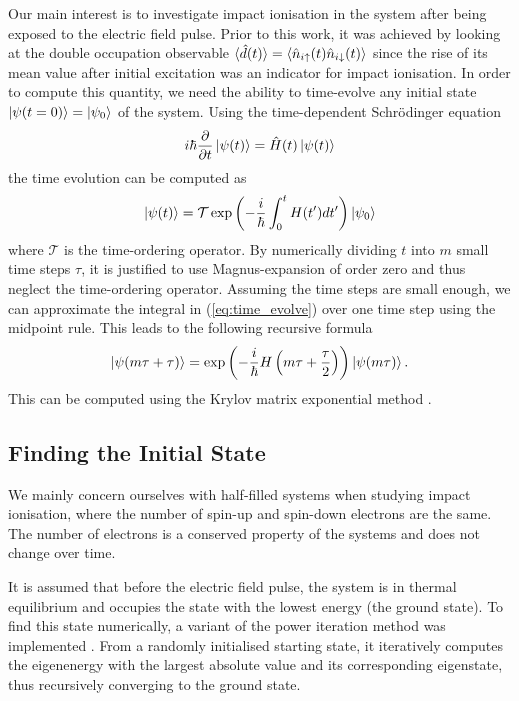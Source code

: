 Our main interest is to investigate impact ionisation in the system after being exposed to the electric field pulse. Prior to this work, it was achieved by looking at the double occupation observable $\braket{\hat{d}(t)} = \braket{\hat{n}_{i\uparrow}(t) \hat{n}_{i\downarrow}(t)}$ since the rise of its mean value after initial excitation was an indicator for impact ionisation. In order to compute this quantity, we need the ability to time-evolve any initial state $\ket{\psi(t=0)} = \ket{\psi_0}$ of the system. Using the time-dependent Schrödinger equation
\begin{equation}
    i\hbar \frac{\partial}{\partial t}\ket{\psi(t)} = \hat{H}(t)\ket{\psi(t)}\label{eq:time_evolve}
\end{equation}
the time evolution can be computed as
\begin{equation}
    \ket{\psi (t)} = \mathcal{T} \exp\left(-\frac{i}{\hbar}\int_0^t H(t') dt'\right) \ket{\psi_0}
\end{equation}
where $\mathcal{T}$ is the time-ordering operator. By numerically dividing $t$ into $m$ small time steps $\tau$, it is justified to use Magnus-expansion \cite{magnus} of order zero and thus neglect the time-ordering operator. Assuming the time steps are small enough, we can approximate the integral in (\ref{eq:time_evolve}) over one time step using the midpoint rule. This leads to the following recursive formula
\begin{equation}
    \ket{\psi(m\tau + \tau)} = \exp\left(-\frac{i}{\hbar} H\left(m\tau + \frac{\tau}{2}\right)\right)\ket{\psi(m\tau)}.
\end{equation}
This can be computed using the Krylov matrix exponential method \cite{innerberger}.


\subsection{Finding the Initial State}
We mainly concern ourselves with half-filled systems when studying impact ionisation, where the number of spin-up and spin-down electrons are the same. The number of electrons is a conserved property of the systems and does not change over time.
\medskip

It is assumed that before the electric field pulse, the system is in thermal equilibrium and occupies the state with the lowest energy (the ground state). To find this state numerically, a variant of the power iteration method was implemented \cite{innerberger}. From a randomly initialised starting state, it iteratively computes the eigenenergy with the largest absolute value and its corresponding eigenstate, thus recursively converging to the ground state.


